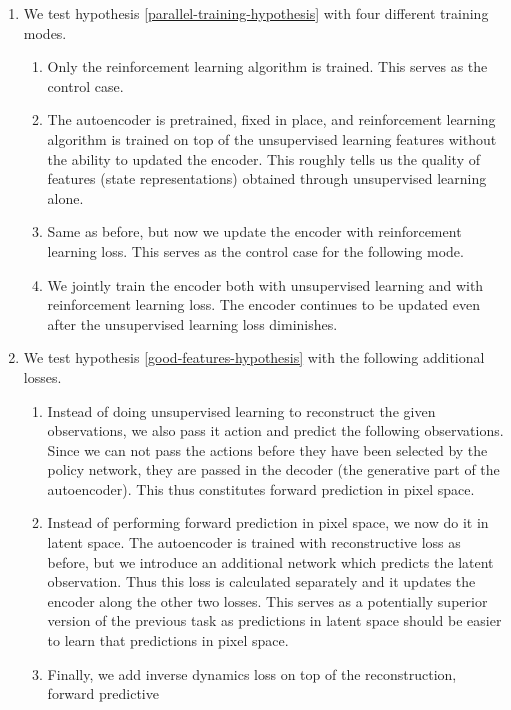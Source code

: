 \begin{enumerate}
		\item We test hypothesis \ref{parallel-training-hypothesis} with four different training modes.
		\begin{enumerate}
				\item Only the reinforcement learning algorithm is trained. This serves as 
						the control case.
				\item The autoencoder is pretrained, fixed in place, and reinforcement learning
						algorithm is trained on top of the unsupervised learning features
						without the ability to updated the encoder. 
						This roughly tells us the quality of features (state representations) 
						obtained through unsupervised learning alone.
				\item Same as before, but now we update the encoder with reinforcement learning loss.
						This serves as the control case for the following mode.
				\item We jointly train the encoder both with unsupervised learning and with
						reinforcement learning loss. The encoder continues to be updated
						even after the unsupervised learning loss diminishes.
		\end{enumerate}
\item We test hypothesis \ref{good-features-hypothesis} with the following additional losses.
		\begin{enumerate}
				\item Instead of doing unsupervised learning to reconstruct the given observations,
						we also pass it action and predict the following observations.
						Since we can not pass the actions before they have been selected by the policy network,
						they are passed in the decoder (the generative part of the autoencoder).
						This thus constitutes forward prediction in pixel space.
				\item Instead of performing forward prediction in pixel space, we now do it in latent space.
						The autoencoder is trained with reconstructive loss as before, but we introduce
						an additional network which predicts the latent observation. Thus this loss is calculated
						separately and it updates the encoder along the other two losses.
						This serves as a potentially superior version of the previous task as predictions
						in latent space should be easier to learn that predictions in pixel space.
				\item Finally, we add inverse dynamics loss on top of the reconstruction, forward predictive 

\end{enumerate}
\end{enumerate}
